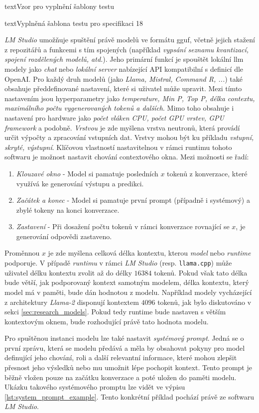 \documentclass[czech, ma, kiv, he, iso690numb, pdf, viewonly]{fasthesis}
\begin{document}
\begin{code}{text}{Vzor pro vyplnění šablony testu \label{lst:template}}
{\begin{code}{text}{Vyplněná šablona testu pro specifikaci 18 \label{lst:spec18}}
{            \textit{LM Studio} umožňuje spuštění právě modelů ve formátu \acrshort{gguf}, včetně jejich stažení z repozitářů a funkcemi s tím spojených (například \textit{vypsání seznamu kvantizací, spojení rozdělených modelů, atd.}). Jeho primární funkcí je spouštět lokální \Gls{llm} modely jako \textit{chat} nebo \textit{lokální server} nabízející API kompatibilní s definicí dle OpenAI. Pro každý druh modelů (jako \textit{Llama, Mistral, Command R, ...}) také obsahuje předdefinované nastavení, které si uživatel může upravit. Mezi tímto nastavením jsou hyperparametry jako \textit{\gls{temperature}, Min P, Top P, délka \gls{context}u, maximálního počtu vygenerovaných \gls{token}ů a dalších}. Mimo toho obsahuje i nastavení pro hardware jako \textit{počet vláken CPU, počet GPU vrstev, GPU framework} a podobně. \textit{Vrstvou} je zde myšlena vrstva neutronů, která provádí určit výpočty a zpracování vstupních dat. Vrstvy mohou být ku příkladu \textit{vstupní, skryté, výstupní}. Klíčovou vlastností nastavitelnou v rámci runtimu tohoto softwaru je možnost nastavit chování \gls{context}ového okna. Mezi možnosti se řadí: 
            \begin{enumerate}
                \item \textit{Klouzavé okno} - Model si pamatuje posledních \(x\) tokenů z konverzace, které využívá ke generování výstupu a predikci.
                \item \textit{Začátek a konec} - Model si pamatuje první prompt (případně i systémový) a zbylé tokeny na konci konverzace.
                \item \textit{Zastavení} - Při dosažení počtu tokenů v rámci konverzace rovnající se \(x\), je generování odpovědi zastaveno.
            \end{enumerate}
            Proměnnou \(x\) je zde myšlena celková délka kontextu, kterou \textit{model} nebo \textit{runtime} podporuje. V případě \textit{runtimu} v rámci \textit{LM Studio} (resp. \verb|llama.cpp|) může uživatel délku kontextu zvolit až do délky \(16 384\) \gls{token}ů. Pokud však tato délka bude větší, jak podporovaný kontext samotným modelem, délka kontextu, který model má v paměti, bude dán hodnotou z modelu. Například modely vycházející z architektury \textit{Llama-2} disponují kontextem \(4096\) \gls{token}ů, jak bylo diskutováno v sekci \ref{sec:research_models}. Pokud tedy runtime bude nastaven s větším kontextovým oknem, bude rozhodující právě tato hodnota modelu.
            
            Pro spuštěnou instanci modelu lze také nastavit \textit{systémový prompt}. Jedná se o první zprávu, která se modelu předává a měla by obsahovat pokyny pro model definující jeho chování, roli a další relevantní informace, které mohou zlepšit přesnost jeho výsledků nebo mu umožnit lépe pochopit kontext. Tento prompt je běžně vložen pouze na začátku konverzace a poté uložen do paměti modelu. Ukázku takového systémového promptu lze vidět ve výpisu \ref{lst:system_prompt_example}. Tento konkrétní příklad pochází právě ze softwaru \textit{LM Studio}.

}
\end{code}}
\end{code}
\end{document}
